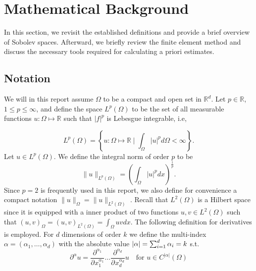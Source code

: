 
\section{Mathematical Background}%
\label{sec:mathematical_background}

In this section, we revisit the established definitions and provide a brief overview of Sobolev spaces. Afterward, we briefly review the finite element method and discuss the necessary tools required for calculating a priori estimates.


\subsection{Notation}%
\label{sub:notation}

We will in this report assume $\Omega $ to be a compact and open set in $\mathbb{R} ^{d}$. Let $p \in \mathbb{R} $, $ 1 \le  p \le  \infty$, and  define the space $L^{p}\left( \Omega  \right) $ to be the set of all measurable functions $u: \Omega  \mapsto \mathbb{R} $ such that
$\left\lvert f \right\rvert ^{p}$ is Lebesgue integrable, i.e,

\begin{equation*}
    L^{p}\left( \Omega  \right) = \left\{ u: \Omega \mapsto \mathbb{R}  \mid \int_{\Omega }^{} \left\lvert u \right\rvert ^{p} d \Omega  < \infty  \right\}
.\end{equation*}
Let $u \in L^{p}\left( \Omega  \right) $. We define the integral norm of order $p$ to be \[
\| u \|_{ L^{p}\left( \Omega  \right)  }^{  }  = \left( \int_{\Omega }^{} \left\lvert u \right\rvert ^{p} dx  \right) ^{\frac{1}{p}}.
\]
Since $p=2$ is frequently used in this report, we also define for convenience a compact notation $\| u \|_{ \Omega  }^{  }  = \| u \|_{ L^{2}\left( \Omega  \right)  }^{  } $ .  Recall that $L^{2}\left( \Omega  \right) $ is a Hilbert space since it is equipped with a inner product of two functions $u,v \in L^{2}\left( \Omega  \right) $ such that
    $
\left( u,v \right) _{\Omega } = \left( u,v \right) _{L^2\left( \Omega  \right) } = \int_{\Omega }^{} u  v dx.
$
The following definition for derivatives is employed.
For $d$ dimensions of order $k$ we define the multi-index $\alpha  = ( \alpha _{1}, \ldots, \alpha _{d})  $ with the absolute value $\left\lvert  \alpha   \right\rvert = \sum_{i=1}^{d}  \alpha _{i} = k $ s.t.
\begin{equation}
    \label{eq:der}
\partial ^{\alpha} u = \frac{\partial ^{ \alpha_{1}  }  } {\partial^{} x_{1}^{\alpha _{1}}  } \ldots \frac{\partial ^{ \alpha_{d}  }  } {\partial^{} x_{d}^{\alpha _{d}}  } u \quad  \text{for }u \in C^{\left\lvert \alpha  \right\rvert }( \Omega )
\end{equation}


